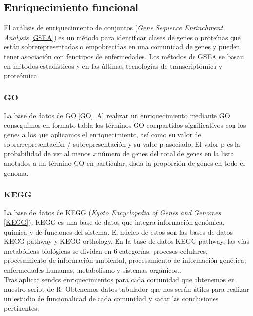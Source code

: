 \subsection{Enriquecimiento funcional}

El análisis de enriquecimiento de conjuntos (\textit{Gene Sequence Enrinchment Analysis} \ref{GSEA}) es un método para identificar clases de genes o proteínas que están sobrerepresentadas o empobrecidas en una comunidad de genes y pueden tener asociación con fenotipos de enfermedades. Los métodos de GSEA se basan en métodos estadísticos y en las últimas tecnologías de transcriptómica y proteómica.

\subsubsection{GO}
La base de datos de GO \ref{GO}. Al realizar un enriquecimiento mediante GO conseguimos en formato tabla los términos GO compartidos significativos con los genes a los que aplicamos el enriquecimiento, así como su valor de sobrerrepresentación / subrepresentación y su valor p asociado. El valor p es la probabilidad de ver al menos \textit{x} número de genes del total de genes en la lista anotados a un término GO en particular, dada la proporción de genes en todo el genoma. \\

\subsubsection{KEGG}
La base de datos de KEGG (\textit{Kyoto Encyclopedia of Genes and Genomes} \ref{KEGG}). KEGG es una base de datos que integra información genómica, química y de funciones del sistema. El núcleo de estos son las bases de datos KEGG pathway y KEGG orthology. En la base de datos KEGG pathway, las vías metabólicas biológicas se dividen en 6 categorías: procesos celulares, procesamiento de información ambiental, procesamiento de información genética, enfermedades humanas, metabolismo y sistemas orgánicos.\cite{KEGGpathway}. \\

Tras aplicar sendos enriquecimientos para cada comunidad que obtenemos en nuestro script de R. Obtenemos datos tabulador que nos serán útiles para realizar un estudio de funcionalidad de cada comunidad y sacar las conclusiones pertinentes.